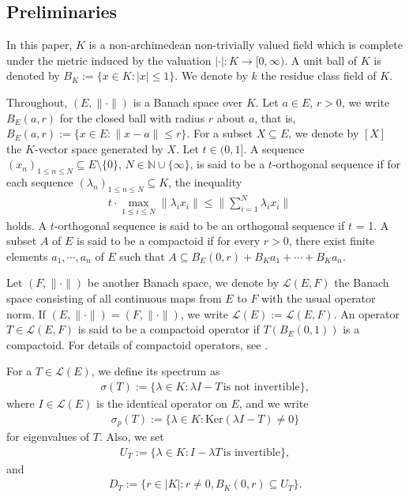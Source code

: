 \documentclass[12pt]{amsart}
\theoremstyle{plain}
\theoremstyle{definition}
\begin{document}
\subsection{Preliminaries}
In this paper, $K$ is a non-archimedean non-trivially valued field which is complete under the metric induced by the valuation $|\cdot| : K \to [0,\infty)$. A unit ball of $K$ is denoted by $B_K := \{ x \in K : |x| \leq 1 \}$. We denote by $k$ the residue class field of $K$.\par
Throughout, $(E,\|\cdot\|)$ is a Banach space over $K$.  Let $a \in E$, $r > 0$, we write $B_E(a,r)$ for the closed ball with radius $r$ about $a$, that is, $B_E(a,r) := \{ x \in E : \|x-a\| \leq r \}$. For a subset $X \subseteq E$, we denote by $[X]$ the $K$-vector space generated by $X$. Let $t \in (0,1]$. A sequence $(x_n)_{1 \le n \le N} \subseteq E \setminus \{0\}$, $N \in \mathbb{N} \cup \{ \infty \}$, is said to be a $t$-orthogonal sequence if for each sequence $(\lambda_n)_{1 \le n \le N} \subseteq K$, the inequality
\begin{align*}
t \cdot \max_{1 \leq i \leq N}  \| \lambda_i x_i \| \leq \| \sum_{i=1}^{N} \lambda_i x_i \| \quad 
\end{align*}
holds. A $t$-orthogonal sequence is said to be an orthogonal sequence if $t$ = 1. A subset $A$ of $E$ is said to be a compactoid if for every $r > 0$, there exist finite elements $a_1, \cdots, a_n$ of $E$ such that $A \subseteq B_E(0,r) + B_K a_1 + \cdots + B_K a_n$. \par 
Let $(F,\|\cdot\|)$ be another Banach space, we denote by $\mathcal{L}(E,F)$ the Banach space consisting of all continuous maps from $E$ to $F$ with the usual operator norm. If $(E,\|\cdot\|) = (F,\|\cdot\|)$, we write $\mathcal{L}(E) := \mathcal{L}(E,F)$. An operator $T \in \mathcal{L}(E,F)$ is said to be a compactoid operator if $T(B_E(0,1))$ is a compactoid. For details of compactoid operators, see \cite{van,sch1,comp}. \par
For a $T \in \mathcal{L}(E)$, we define its spectrum as 
\begin{align*}
  \sigma(T) := \{ \lambda \in K : \lambda I - T \, \text{is not invertible}\},
\end{align*}
where $I \in \mathcal{L}(E)$ is the identical operator on $E$, and we write
\begin{align*}
  \sigma_p(T) := \{ \lambda \in K : \text{Ker} (\lambda I - T) \neq 0 \}
\end{align*}
for eigenvalues of $T$. Also, we set
\begin{align*}
  U_T := \{ \lambda \in K : I - \lambda T \, \text{is invertible} \},
\end{align*}
and
\begin{align*}
  D_T := \{ r \in |K| : r \neq 0, B_K(0,r) \subseteq U_T \}.
\end{align*}
\end{document}
